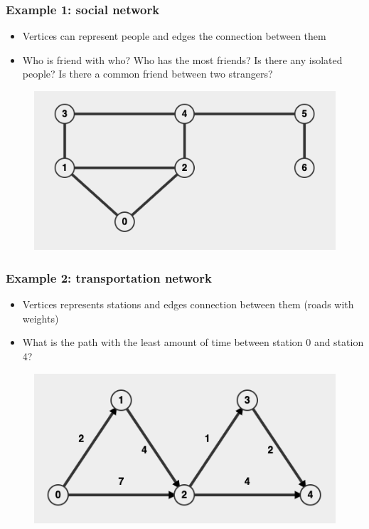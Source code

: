 \documentclass{beamer}
\begin{document}
\begin{frame}
\frametitle{Example 1: social network}
	\begin{itemize}
	    \item Vertices can represent people and edges the connection between them
	    \item Who is friend with who? Who has the most friends? Is there any isolated people? Is there a common friend between two strangers?
	\end{itemize}
	\begin{figure}
	    \centering
	    \includegraphics[scale=0.3]{imgs/2.4/graph/social-network.png}
	\end{figure}
\end{frame}

\begin{frame}
\frametitle{Example 2: transportation network}
	\begin{itemize}
	    \item Vertices represents stations and edges connection between them (roads with weights)
	    \item What is the path with the least amount of time between station 0 and station 4?
	\end{itemize}
	
	\begin{figure}
	    \centering
	    \includegraphics[scale=0.3]{imgs/2.4/graph/transportation-network.png}
	\end{figure}
\end{frame}
\end{document}
